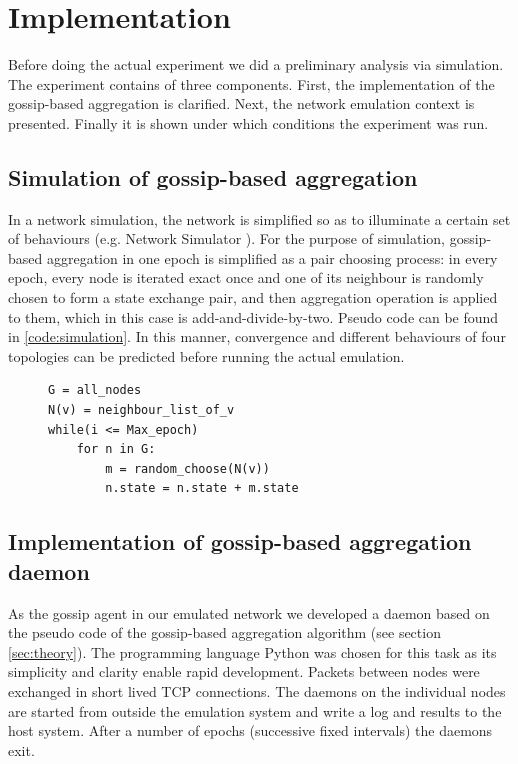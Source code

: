 \section{Implementation}
\label{sec:implementation}
Before doing the actual experiment we did a preliminary analysis via simulation. The experiment contains of three components. First, the implementation of the gossip-based aggregation is clarified. Next, the network emulation context is presented. Finally it is shown under which conditions the experiment was run.

\subsection{Simulation of gossip-based aggregation}
\label{sec:simulation}
In a network simulation, the network is simplified so as to illuminate a certain set of behaviours (e.g. Network Simulator \cite{ns}). For the purpose of simulation, gossip-based aggregation in one epoch is simplified as a pair choosing process: in every epoch, every node is iterated exact once and one of its neighbour is randomly chosen to form a state exchange pair, and then aggregation operation is applied to them, which in this case is add-and-divide-by-two. Pseudo code can be found in \ref{code:simulation}. In this manner, convergence and different behaviours of four topologies can be predicted before running the actual emulation.

\begin{figure}[!h]
\begin{lstlisting}[caption={Pseudo Code for gossip-based aggregation simulation}, label=code:simulation, mathescape=true, captionpos=b]
G = all_nodes
N(v) = neighbour_list_of_v
while(i <= Max_epoch)
	for n in G:
		m = random_choose(N(v))
		n.state = n.state + m.state
\end{lstlisting}
\end{figure}

\subsection{Implementation of gossip-based aggregation daemon}
As the gossip agent in our emulated network we developed a daemon based on the pseudo code of the gossip-based aggregation algorithm (see section \ref{sec:theory}). The programming language Python \cite{python} was chosen for this task as its simplicity and clarity enable rapid development. Packets between nodes were exchanged in short lived TCP connections. The daemons on the individual nodes are started from outside the emulation system and write a log and results to the host system. After a number of epochs (successive fixed intervals) the daemons exit.

